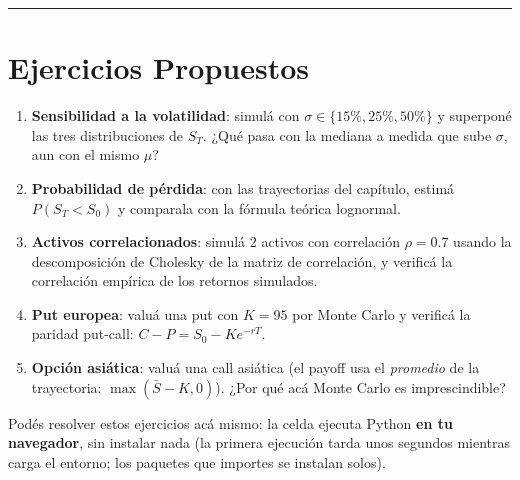 \documentclass[
  spanish,
  letterpaper,
  DIV=11,
  numbers=noendperiod]{scrreprt}
\providecommand{\tightlist}{%
  \setlength{\itemsep}{0pt}\setlength{\parskip}{0pt}}
\begin{document}
\begin{center}\rule{0.5\linewidth}{0.5pt}\end{center}

\chapter{Ejercicios Propuestos}\label{ejercicios-propuestos-12}

\begin{tcolorbox}[enhanced jigsaw, bottomrule=.15mm, colback=white, opacitybacktitle=0.6, arc=.35mm, toprule=.15mm, opacityback=0, breakable, titlerule=0mm, left=2mm, coltitle=black, colbacktitle=quarto-callout-important-color!10!white, colframe=quarto-callout-important-color-frame, leftrule=.75mm, toptitle=1mm, bottomtitle=1mm, title=\textcolor{quarto-callout-important-color}{\faExclamation}\hspace{0.5em}{Ejercicios}, rightrule=.15mm]

\begin{enumerate}
\def\labelenumi{\arabic{enumi}.}
\tightlist
\item
  \textbf{Sensibilidad a la volatilidad}: simulá con
  \(\sigma \in \{15\%, 25\%, 50\%\}\) y superponé las tres
  distribuciones de \(S_T\). ¿Qué pasa con la mediana a medida que sube
  \(\sigma\), aun con el mismo \(\mu\)?
\item
  \textbf{Probabilidad de pérdida}: con las trayectorias del capítulo,
  estimá \(P(S_T < S_0)\) y comparala con la fórmula teórica lognormal.
\item
  \textbf{Activos correlacionados}: simulá 2 activos con correlación
  \(\rho = 0.7\) usando la descomposición de Cholesky de la matriz de
  correlación, y verificá la correlación empírica de los retornos
  simulados.
\item
  \textbf{Put europea}: valuá una put con \(K = 95\) por Monte Carlo y
  verificá la paridad put-call: \(C - P = S_0 - Ke^{-rT}\).
\item
  \textbf{Opción asiática}: valuá una call asiática (el payoff usa el
  \emph{promedio} de la trayectoria: \(\max(\bar{S} - K, 0)\)). ¿Por qué
  acá Monte Carlo es imprescindible?
\end{enumerate}

\end{tcolorbox}

Podés resolver estos ejercicios acá mismo: la celda ejecuta Python
\textbf{en tu navegador}, sin instalar nada (la primera ejecución tarda
unos segundos mientras carga el entorno; los paquetes que importes se
instalan solos).
\end{document}
